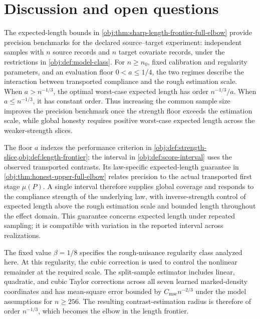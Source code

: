 \section{Discussion and open questions}
\label{sec:discussion}

The expected-length bounds in \cref{obj:thm:sharp-length-frontier-full-elbow} provide precision benchmarks for the declared source--target experiment: independent samples with \(n\) source records and \(n\) target covariate records, under the restrictions in \cref{obj:def:model-class}. For \(n\ge n_0\), fixed calibration and regularity parameters, and an evaluation floor \(0<a\le1/4\), the two regimes describe the interaction between transported compliance and the rough estimation scale. When \(a>n^{-1/3}\), the optimal worst-case expected length has order \(n^{-1/3}/a\). When \(a\le n^{-1/3}\), it has constant order. Thus increasing the common sample size improves the precision benchmark once the strength floor exceeds the estimation scale, while global honesty requires positive worst-case expected length across the weaker-strength slices.

The floor \(a\) indexes the performance criterion in \cref{obj:def:strength-slice,obj:def:length-frontier}; the interval in \cref{obj:def:score-interval} uses the observed transported contrasts. Its law-specific expected-length guarantee in \cref{obj:thm:honest-upper-full-elbow} relates precision to the actual transported first stage \(\mu(P)\). A single interval therefore supplies global coverage and responds to the compliance strength of the underlying law, with inverse-strength control of expected length above the rough estimation scale and bounded length throughout the effect domain. This guarantee concerns expected length under repeated sampling; it is compatible with variation in the reported interval across realizations.

The fixed value \(\beta=1/8\) specifies the rough-nuisance regularity class analyzed here. At this regularity, the cubic correction is used to control the nonlinear remainder at the required scale. The split-sample estimator includes linear, quadratic, and cubic Taylor corrections across all seven learned marked-density coordinates and has mean-square error bounded by \(C_{\mathrm{mse}}n^{-2/3}\) under the model assumptions for \(n\ge256\). The resulting contrast-estimation radius is therefore of order \(n^{-1/3}\), which becomes the elbow in the length frontier.


